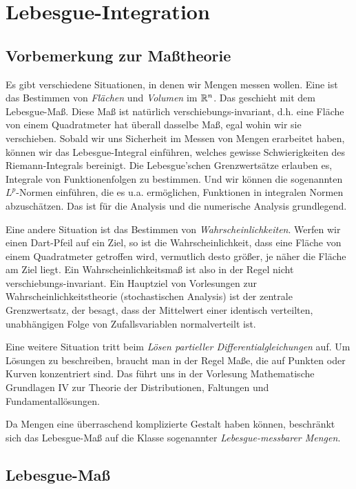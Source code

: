 \section{Lebesgue-Integration}


\subsection{Vorbemerkung zur Maßtheorie}

Es gibt verschiedene Situationen, in denen wir Mengen messen wollen.
Eine ist das Bestimmen von \emph{Flächen} und \emph{Volumen} im \(\mathbb{R}^n\).
Das geschieht mit dem Lebesgue-Maß.
Diese Maß ist natürlich verschiebungs-invariant, d.h. eine Fläche von einem Quadratmeter hat überall dasselbe Maß, egal wohin wir sie verschieben.
Sobald wir uns Sicherheit im Messen von Mengen erarbeitet haben, können wir das Lebesgue-Integral einführen, welches gewisse Schwierigkeiten des Riemann-Integrals bereinigt.
Die Lebesgue'schen Grenzwertsätze erlauben es, Integrale von Funktionenfolgen zu bestimmen.
Und wir können die sogenannten \(L^p\)-Normen einführen, die es u.a. ermöglichen, Funktionen in integralen Normen abzuschätzen.
Das ist für die Analysis und die numerische Analysis grundlegend.

Eine andere Situation ist das Bestimmen von \emph{Wahrscheinlichkeiten}.
Werfen wir einen Dart-Pfeil auf ein Ziel, so ist die Wahrscheinlichkeit, dass eine Fläche von einem Quadratmeter getroffen wird, vermutlich desto größer, je näher die Fläche am Ziel liegt.
Ein Wahrscheinlichkeitsmaß ist also in der Regel nicht verschiebungs-invariant.
Ein Hauptziel von Vorlesungen zur Wahrscheinlichkeitstheorie (stochastischen Analysis) ist der zentrale Grenzwertsatz, der besagt, dass der Mittelwert einer identisch verteilten, unabhängigen Folge von Zufallsvariablen normalverteilt ist.

Eine weitere Situation tritt beim \emph{Lösen partieller Differentialgleichungen} auf.
Um Lösungen zu beschreiben, braucht man in der Regel Maße, die auf Punkten oder Kurven konzentriert sind.
Das führt uns in der Vorlesung Mathematische Grundlagen IV zur Theorie der Distributionen, Faltungen und Fundamentallösungen.

Da Mengen eine überraschend komplizierte Gestalt haben können, beschränkt sich das Lebesgue-Maß auf die Klasse sogenannter \emph{Lebesgue-messbarer Mengen}.


\subsection{Lebesgue-Maß}


